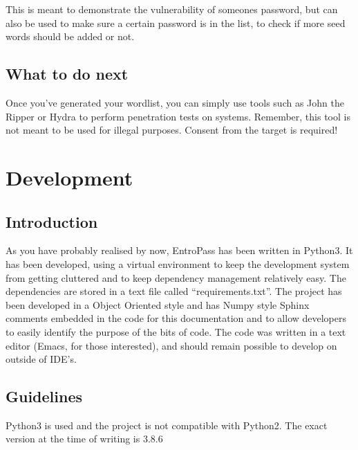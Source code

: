 \documentclass[letterpaper,10pt,english]{sphinxmanual}
\begin{document}
\sphinxAtStartPar
This is meant to demonstrate the vulnerability of someones password, but can also be used to make sure a certain password is in the list, to check if more seed words should be added or not.


\section{What to do next}
\label{\detokenize{usage:what-to-do-next}}
\sphinxAtStartPar
Once you’ve generated your wordlist, you can simply use tools such as John the Ripper or Hydra to perform penetration tests on systems. Remember, this tool is not meant to be used for illegal purposes. Consent from the target is required!


\chapter{Development}
\label{\detokenize{development:development}}\label{\detokenize{development::doc}}

\section{Introduction}
\label{\detokenize{development:introduction}}
\sphinxAtStartPar
As you have probably realised by now, EntroPass has been written in Python3. It has been developed, using a virtual environment to keep the development system from getting cluttered and to keep dependency management relatively easy. The dependencies are stored in a text file called “requirements.txt”. The project has been developed in a Object Oriented style and has Numpy style Sphinx comments embedded in the code for this documentation and to allow developers to easily identify the purpose of the bits of code. The code was written in a text editor (Emacs, for those interested), and should remain possible to develop on outside of IDE’s.


\section{Guidelines}
\label{\detokenize{development:guidelines}}

\begin{fulllineitems}
\sphinxAtStartPar
Python3 is used and the project is not compatible with Python2. The exact version at the time of writing is 3.8.6

\end{fulllineitems}
\end{document}
